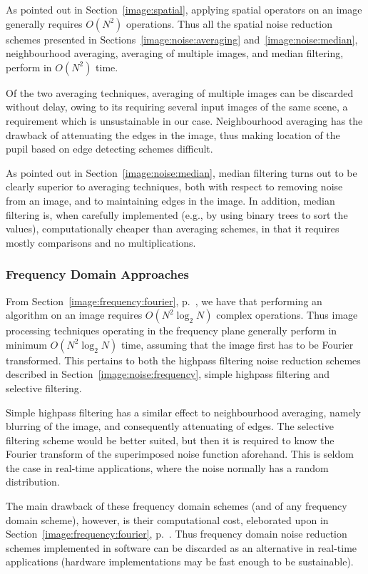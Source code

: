 As pointed out in Section~\ref{image:spatial}, applying spatial
operators on an image generally requires $O(N^{2})$ operations.  Thus
all the spatial noise reduction schemes presented in
Sections~\ref{image:noise:averaging} and~\ref{image:noise:median},
neighbourhood averaging, averaging of multiple images, and median
filtering, perform in $O(N^{2})$ time.

Of the two averaging techniques, averaging of multiple images can be
discarded without delay, owing to its requiring several input images
of the same scene, a requirement which is unsustainable in our case.
Neighbourhood averaging has the drawback of attenuating the edges in
the image, thus making location of the pupil based on edge detecting
schemes difficult.

As pointed out in Section~\ref{image:noise:median}, median filtering
turns out to be clearly superior to averaging techniques, both with
respect to removing noise from an image, and to maintaining edges in
the image.  In addition, median filtering is, when carefully
implemented (e.g., by using binary trees to sort the values),
computationally cheaper than averaging schemes, in that it requires
mostly comparisons and no multiplications.

\subsubsection{Frequency Domain Approaches}

From Section~\ref{image:frequency:fourier}, p.~\pageref{pg:fft:O}, we
have that performing an {\fft} algorithm on an image requires
$O(N^{2}\log_{2}N)$ complex operations.  Thus image processing
techniques operating in the frequency plane generally perform in
minimum $O(N^{2}\log_{2}N)$ time, assuming that the image first has to
be Fourier transformed.  This pertains to both the highpass filtering
noise reduction schemes described in
Section~\ref{image:noise:frequency}, simple highpass filtering and
selective filtering.

Simple highpass filtering has a similar effect to neighbourhood
averaging, namely blurring of the image, and consequently attenuating
of edges.  The selective filtering scheme would be better suited, but
then it is required to know the Fourier transform of the superimposed
noise function aforehand.  This is seldom the case in real-time
applications, where the noise normally has a random distribution.

The main drawback of these frequency domain schemes (and of any
frequency domain scheme), however, is their computational cost,
eleborated upon in Section~\ref{image:frequency:fourier},
p.~\pageref{pg:fft:O}.  Thus frequency domain noise reduction schemes
implemented in software can be discarded as an alternative in
real-time applications (hardware implementations may be fast enough to
be sustainable).

